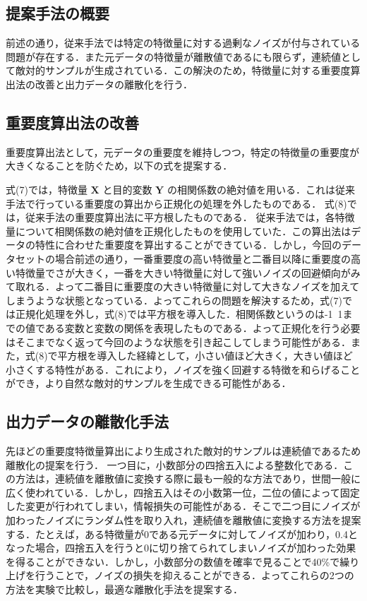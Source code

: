 \subsection{提案手法の概要}
前述の通り，従来手法では特定の特徴量に対する過剰なノイズが付与されている問題が存在する．また元データの特徴量が離散値であるにも限らず，連続値として敵対的サンプルが生成されている．この解決のため，特徴量に対する重要度算出法の改善と出力データの離散化を行う．
\subsection{重要度算出法の改善}
重要度算出法として，元データの重要度を維持しつつ，特定の特徴量の重要度が大きくなることを防ぐため，以下の式を提案する．


式(7)では，特徴量 $\bm{X}$ と目的変数 $\bm{Y}$ の相関係数の絶対値を用いる．これは従来手法で行っている重要度の算出から正規化の処理を外したものである．
式(8)では，従来手法の重要度算出法に平方根したものである．
従来手法では，各特徴量について相関係数の絶対値を正規化したものを使用していた．この算出法はデータの特性に合わせた重要度を算出することができている．しかし，今回のデータセットの場合前述の通り，一番重要度の高い特徴量と二番目以降に重要度の高い特徴量でさが大きく，一番を大きい特徴量に対して強いノイズの回避傾向がみて取れる．よって二番目に重要度の大きい特徴量に対して大きなノイズを加えてしまうような状態となっている．よってこれらの問題を解決するため，式(7)では正規化処理を外し，式(8)では平方根を導入した．相関係数というのは-1~1までの値である変数と変数の関係を表現したものである．よって正規化を行う必要はそこまでなく返って今回のような状態を引き起こしてしまう可能性がある．また，式(8)で平方根を導入した経緯として，小さい値ほど大きく，大きい値ほど小さくする特性がある．これにより，ノイズを強く回避する特徴を和らげることができ，より自然な敵対的サンプルを生成できる可能性がある．

\subsection{出力データの離散化手法}

先ほどの重要度特徴量算出により生成された敵対的サンプルは連続値であるため離散化の提案を行う．
一つ目に，小数部分の四捨五入による整数化である．この方法は，連続値を離散値に変換する際に最も一般的な方法であり，世間一般に広く使われている．しかし，四捨五入はその小数第一位，二位の値によって固定した変更が行われてしまい，情報損失の可能性がある．そこで二つ目にノイズが加わったノイズにランダム性を取り入れ，連続値を離散値に変換する方法を提案する．たとえば，ある特徴量が0である元データに対してノイズが加わり，0.4となった場合，四捨五入を行うと0に切り捨てられてしまいノイズが加わった効果を得ることができない．しかし，小数部分の数値を確率で見ることで40\%で繰り上げを行うことで，ノイズの損失を抑えることができる．よってこれらの2つの方法を実験で比較し，最適な離散化手法を提案する．